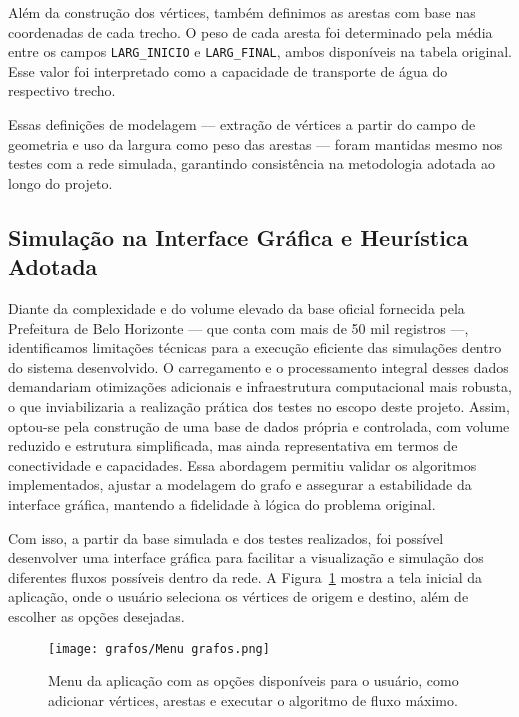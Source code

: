 \documentclass[12pt]{article}
\begin{document}
Além da construção dos vértices, também definimos as arestas com base nas coordenadas de cada trecho. O peso de cada aresta foi determinado pela média entre os campos \texttt{LARG\_INICIO} e \texttt{LARG\_FINAL}, ambos disponíveis na tabela original. Esse valor foi interpretado como a capacidade de transporte de água do respectivo trecho.

Essas definições de modelagem — extração de vértices a partir do campo de geometria e uso da largura como peso das arestas — foram mantidas mesmo nos testes com a rede simulada, garantindo consistência na metodologia adotada ao longo do projeto.

\subsection{Simulação na Interface Gráfica e Heurística Adotada}

Diante da complexidade e do volume elevado da base oficial fornecida pela Prefeitura de Belo Horizonte — que conta com mais de 50 mil registros —, identificamos limitações técnicas para a execução eficiente das simulações dentro do sistema desenvolvido. O carregamento e o processamento integral desses dados demandariam otimizações adicionais e infraestrutura computacional mais robusta, o que inviabilizaria a realização prática dos testes no escopo deste projeto. Assim, optou-se pela construção de uma base de dados própria e controlada, com volume reduzido e estrutura simplificada, mas ainda representativa em termos de conectividade e capacidades. Essa abordagem permitiu validar os algoritmos implementados, ajustar a modelagem do grafo e assegurar a estabilidade da interface gráfica, mantendo a fidelidade à lógica do problema original.

Com isso, a partir da base simulada e dos testes realizados, foi possível desenvolver uma interface gráfica para facilitar a visualização e simulação dos diferentes fluxos possíveis dentro da rede. A Figura~\ref{fig:menu_acoes} mostra a tela inicial da aplicação, onde o usuário seleciona os vértices de origem e destino, além de escolher as opções desejadas.

\begin{figure}[H]
\centering
\texttt{[image: grafos/Menu grafos.png]}
\caption{Menu da aplicação com as opções disponíveis para o usuário, como adicionar vértices, arestas e executar o algoritmo de fluxo máximo.}
\label{fig:menu_acoes}
\end{figure}
\end{document}

